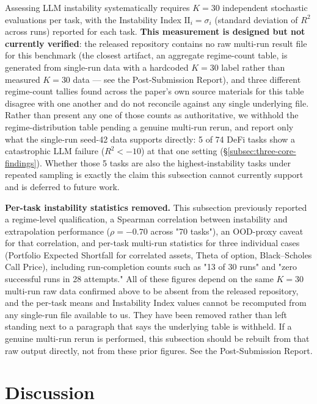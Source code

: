 \documentclass[twoside,11pt]{article}
\newcommand{\Rsq}{R^{2}}
\newcommand{\II}{\mathrm{II}}
\begin{document}
Assessing LLM instability systematically requires $K=30$ independent stochastic
evaluations per task, with the Instability Index $\II_i = \sigma_i$ (standard
deviation of $\Rsq$ across runs) reported for each task. \textbf{This
measurement is designed but not currently verified}: the released repository
contains no raw multi-run result file for this benchmark (the closest
artifact, an aggregate regime-count table, is generated from single-run data
with a hardcoded $K=30$ label rather than measured $K=30$ data --- see the
Post-Submission Report), and three different regime-count tallies found across
the paper's own source materials for this table disagree with one another and
do not reconcile against any single underlying file. Rather than present any
one of those counts as authoritative, we withhold the regime-distribution
table pending a genuine multi-run rerun, and report only what the single-run
seed-42 data supports directly: 5 of 74 DeFi tasks show a catastrophic LLM
failure ($\Rsq < -10$) at that one setting
(\S\ref{subsec:three-core-findings}). Whether those 5 tasks are also the
highest-instability tasks under repeated sampling is exactly the claim this
subsection cannot currently support and is deferred to future work.

\textbf{Per-task instability statistics removed.} This subsection previously
reported a regime-level qualification, a Spearman correlation between
instability and extrapolation performance ($\rho=-0.70$ across "70 tasks"),
an OOD-proxy caveat for that correlation, and per-task multi-run statistics
for three individual cases (Portfolio Expected Shortfall for correlated
assets, Theta of option, Black--Scholes Call Price), including run-completion
counts such as "13 of 30 runs" and "zero successful runs in 28 attempts."
All of these figures depend on the same $K=30$ multi-run raw data confirmed
above to be absent from the released repository, and the per-task means and
Instability Index values cannot be recomputed from any single-run file
available to us. They have been removed rather than left standing next to a
paragraph that says the underlying table is withheld. If a genuine multi-run
rerun is performed, this subsection should be rebuilt from that raw output
directly, not from these prior figures. See the Post-Submission Report.

\section{Discussion}
\label{sec:discussion}
\end{document}
